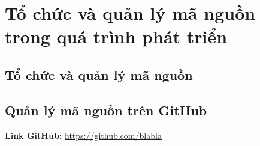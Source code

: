 \section{Tổ chức và quản lý mã nguồn trong quá trình phát triển}

\subsection{Tổ chức và quản lý mã nguồn}

\subsection{Quản lý mã nguồn trên GitHub}
\textbf{Link GitHub:} \url{https://github.com/blabla}